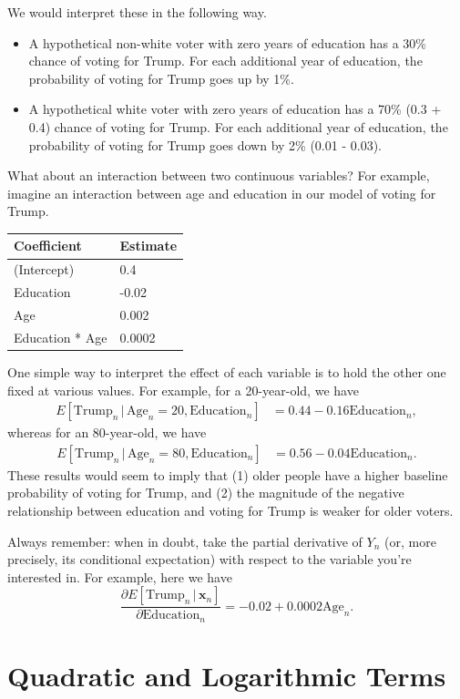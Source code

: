 \documentclass[
  12pt,
  oneside,openany]{book}
\begin{document}
We would interpret these in the following way.

\begin{itemize}
\item
  A hypothetical non-white voter with zero years of education has a 30\% chance of voting for Trump. For each additional year of education, the probability of voting for Trump goes up by 1\%.
\item
  A hypothetical white voter with zero years of education has a 70\% (0.3 + 0.4) chance of voting for Trump. For each additional year of education, the probability of voting for Trump goes down by 2\% (0.01 - 0.03).
\end{itemize}

What about an interaction between two continuous variables? For example, imagine an interaction between age and education in our model of voting for Trump.

\begin{longtable}[]{@{}ll@{}}
\toprule
Coefficient & Estimate\tabularnewline
\midrule
\endhead
(Intercept) & 0.4\tabularnewline
Education & -0.02\tabularnewline
Age & 0.002\tabularnewline
Education * Age & 0.0002\tabularnewline
\bottomrule
\end{longtable}

One simple way to interpret the effect of each variable is to hold the other one fixed at various values. For example, for a 20-year-old, we have
\[
\begin{aligned}
E[\text{Trump}_n \,|\, \text{Age}_n = 20, \text{Education}_n] &= 0.44 - 0.16 \text{Education}_n,
\end{aligned}
\]
whereas for an 80-year-old, we have
\[
\begin{aligned}
E[\text{Trump}_n \,|\, \text{Age}_n = 80, \text{Education}_n] &= 0.56 - 0.04 \text{Education}_n.
\end{aligned}
\]
These results would seem to imply that (1) older people have a higher baseline probability of voting for Trump, and (2) the magnitude of the negative relationship between education and voting for Trump is weaker for older voters.

Always remember: when in doubt, take the partial derivative of \(Y_n\) (or, more precisely, its conditional expectation) with respect to the variable you're interested in. For example, here we have
\[
\frac{\partial{}E[\text{Trump}_n \,|\, \mathbf{x}_n]}{\partial{}\text{Education}_n} = -0.02 + 0.0002 \text{Age}_n.
\]

\hypertarget{quadratic-and-logarithmic-terms}{%
\section{Quadratic and Logarithmic Terms}\label{quadratic-and-logarithmic-terms}}
\end{document}

